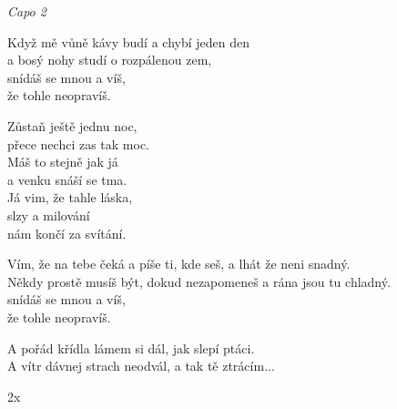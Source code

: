 
\re{}\textit{Capo 2}

\ve{}
Když mě vůně kávy budí a chybí jeden den\\
a bosý nohy studí o rozpálenou zem,\\
snídáš se mnou a víš,  \\
že tohle neopravíš.  

\cho{}
Zůstaň ještě jednu noc,\\
přece nechci zas tak moc.\\
Máš to stejně jak já\\
a venku snáší se tma.\\
Já vim, že tahle láska,\\
slzy a milování\\
nám končí za svítání.

\ve{}
Vím, že na tebe čeká a píše ti, kde seš,
a lhát že neni snadný.\\
Někdy prostě musíš být, dokud nezapomeneš a rána jsou tu chladný.\\
snídáš se mnou a víš,\\
že tohle neopravíš.

\cho{}
\re{*}
A pořád křídla lámem si dál, jak slepí ptáci.\\
A vítr dávnej strach neodvál, a tak tě ztrácím...

\cho{}
2x

\esong{}